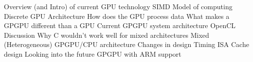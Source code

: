 \documentclass{article}
\begin{document}
\begin{outline}[enumerate]
   \1 Overview (and Intro) of current GPU technology
   		\2 SIMD Model of computing
   \1 Discrete GPU Architecture 
   		\2 How does the GPU process data
   \1 What makes a GPGPU different than a GPU
   \1 Current GPGPU system architecture
   \1 OpenCL Discussion
   		\2 Why C wouldn't work well for mixed architectures  
   \1 Mixed (Heterogeneous) GPGPU/CPU architecture
		\2 Changes in design
			\3 Timing
			\3 ISA
			\3 Cache design
	\1 Looking into the future
		\2 GPGPU with ARM support
\end{outline}
\end{document}
